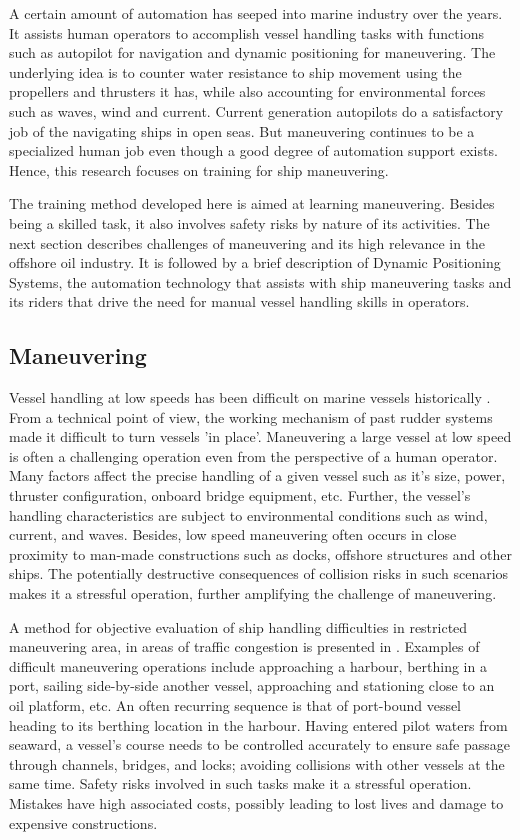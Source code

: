 A certain amount of automation has seeped into marine industry over the years. It assists human operators to accomplish vessel handling tasks with functions such as autopilot for navigation and dynamic positioning for maneuvering. The underlying idea is to counter water resistance to ship movement using the propellers and thrusters it has, while also accounting for environmental forces such as waves, wind and current. Current generation autopilots do a satisfactory job of the navigating ships in open seas. But maneuvering continues to be a specialized human job even though a good degree of automation support exists. Hence, this research focuses on training for ship maneuvering. 

The training method developed here is aimed at learning maneuvering. Besides being a skilled task, it also involves safety risks by nature of its activities. The next section describes challenges of maneuvering and its high relevance in the offshore oil industry. It is followed by a brief description of Dynamic Positioning Systems, the automation technology that assists with ship maneuvering tasks and its riders that drive the need for manual vessel handling skills in operators. 

\subsection{Maneuvering}


Vessel handling at low speeds has been difficult on marine vessels historically \cite{brittanica:ship}. From a technical point of view, the working mechanism of past rudder systems made it difficult to turn vessels 'in place'. Maneuvering a large vessel at low speed is often a challenging operation even from the perspective of a human operator. Many factors affect the precise handling of a given vessel such as it's size, power, thruster configuration, onboard bridge equipment, etc. Further, the vessel's handling characteristics are subject to environmental conditions such as wind, current, and waves. Besides, low speed maneuvering often occurs in close proximity to man-made constructions such as docks, offshore structures and other ships. The potentially destructive consequences of collision risks in such scenarios makes it a stressful operation, further amplifying the challenge of maneuvering.

A method for objective evaluation of ship handling difficulties in restricted maneuvering area, in areas of traffic congestion is presented in \parencite{inoue2000evaluation}. Examples of difficult maneuvering operations include approaching a harbour, berthing in a port, sailing side-by-side another vessel, approaching and stationing close to an oil platform, etc. An often recurring sequence is that of  port-bound vessel heading to its berthing location in the harbour. Having entered pilot waters from seaward, a vessel's course needs to be controlled accurately to ensure safe passage through channels, bridges, and locks; avoiding collisions with other vessels at the same time. Safety risks involved in such tasks make it a stressful operation. Mistakes have high associated costs, possibly leading to lost lives and damage to expensive constructions.

